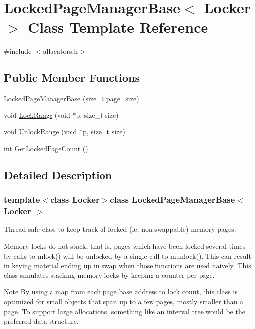 \hypertarget{class_locked_page_manager_base}{}\section{Locked\+Page\+Manager\+Base$<$ Locker $>$ Class Template Reference}
\label{class_locked_page_manager_base}


{\ttfamily \#include $<$allocators.\+h$>$}

\subsection*{Public Member Functions}
\begin{DoxyCompactItemize}
\item 
\hyperlink{class_locked_page_manager_base_ad1974eafb41a3cae3358e34b7896419a}{Locked\+Page\+Manager\+Base} (size\+\_\+t page\+\_\+size)
\item 
void \hyperlink{class_locked_page_manager_base_ae24ac08899505b892d451404133fa494}{Lock\+Range} (void $\ast$p, size\+\_\+t size)
\item 
void \hyperlink{class_locked_page_manager_base_a34bcf7b9120295ed178fe9545ed229af}{Unlock\+Range} (void $\ast$p, size\+\_\+t size)
\item 
int \hyperlink{class_locked_page_manager_base_a8074f7d1b43cc8dd34b3ba9cdb2eca50}{Get\+Locked\+Page\+Count} ()
\end{DoxyCompactItemize}


\subsection{Detailed Description}
\subsubsection*{template$<$class Locker$>$class Locked\+Page\+Manager\+Base$<$ Locker $>$}

Thread-\/safe class to keep track of locked (ie, non-\/swappable) memory pages.

Memory locks do not stack, that is, pages which have been locked several times by calls to mlock() will be unlocked by a single call to munlock(). This can result in keying material ending up in swap when those functions are used naively. This class simulates stacking memory locks by keeping a counter per page.

\begin{DoxyNote}{Note}
By using a map from each page base address to lock count, this class is optimized for small objects that span up to a few pages, mostly smaller than a page. To support large allocations, something like an interval tree would be the preferred data structure. 
\end{DoxyNote}


